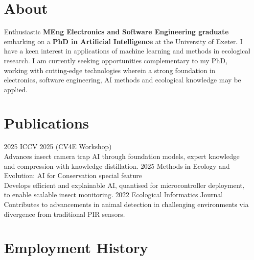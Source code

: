 \documentclass[]{cv-style}     %
\begin{document}
\section{About}
  \vspace{-0.36cm}

Enthusiastic \textbf{MEng Electronics and Software Engineering graduate} embarking on a \textbf{PhD in Artificial Intelligence} at the University of Exeter. I have a keen interest in applications of machine learning and methods in ecological research. I am currently seeking opportunities complementary to my PhD, working with cutting-edge technologies wherein a strong foundation in electronics, software engineering, AI methods and ecological knowledge may be applied.
  \vspace{-0.2cm}
\section{Publications}
  \vspace{-0.3cm}
\begin{entrylist}
\entry
{2025}
{ICCV 2025 (CV4E Workshop) }
{}
{ \\ Advances insect camera trap AI through foundation models, expert knowledge and compression with knowledge distillation.}
\entry
{2025}
{Methods in Ecology and Evolution: AI for Conservation special feature}
{}
{ \\ Develops efficient and explainable AI, quantised for microcontroller deployment, to enable scalable insect monitoring. }
  \entry
    {2022}
    {Ecological Informatics Journal}
    {}
    {\\ Contributes to advancements in animal detection in challenging environments via divergence from traditional PIR sensors.}
    \end{entrylist}
  \vspace{-0.2cm}
\section{Employment History}
  \vspace{-0.3cm}
  
\end{document}
